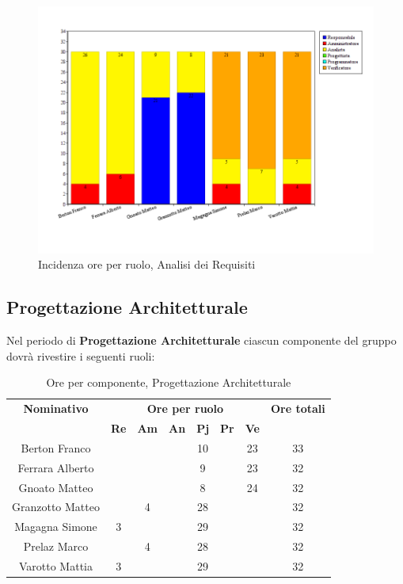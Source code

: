 \begin{figure}[H]
	\centering
	\includegraphics[scale=0.4]{immagini/Grafi/GrafoAR}
	\caption{Incidenza ore per ruolo, Analisi dei Requisiti}
\end{figure}

\subsection{Progettazione Architetturale}
Nel periodo di \textbf{Progettazione Architetturale} ciascun componente del gruppo dovrà rivestire i seguenti ruoli:
\begin{table}[H]
	\begin{center}
		\begin{tabular}{|c|c|c|c|c|c|c|c|}
			\hline
			\textbf{Nominativo} & \multicolumn{6}{c|}{\textbf{Ore per ruolo}} & \textbf{Ore totali} \\
			& \textbf{Re} & \textbf{Am} & \textbf{An} & \textbf{Pj} & \textbf{Pr} & \textbf{Ve} & \\
			\hline
			Berton Franco		&		&		&		&	10	&		&	23	&	33	\\
			\hline
			Ferrara Alberto		&		&		&		&	9 	&		&	23	& 	32	\\
			\hline
			Gnoato Matteo		&		&		&		&	8	&		&	24	&	32	\\
			\hline									
			Granzotto Matteo	&		&	 4	&  		&	28	&	 	& 		&	32	\\
			\hline
			Magagna Simone 		&	3	&		&		&	29	&		& 		&	32	\\
			\hline
			Prelaz Marco 		& 		&	4	&		&	28	&		&		&	32	\\
			\hline						
			Varotto Mattia 		&	3	&		&		&	29	&		&		& 	32	\\
			\hline
		\end{tabular}
	\end{center}
	\caption{Ore per componente, Progettazione Architetturale}
\end{table}

